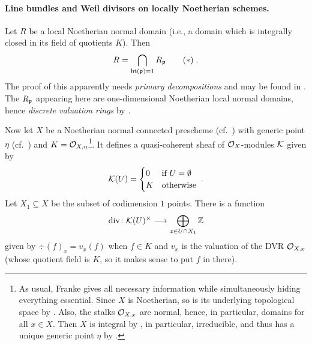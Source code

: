 \documentclass[a4paper,parskip=half,numbers=enddot, DIV=12]{scrreprt}
\begin{document}
\paragraph{Line bundles and Weil divisors on locally Noetherian schemes.} Let $R$ be a local Noetherian normal domain (i.e., a domain which is integrally closed in its field of quotients $K$). Then
\begin{align}\lbl{eq:IntersectionOfLocalizations}
	R=\bigcap_{\hoehe(\pp)=1}R_\pp\tag{$*$}\;.
\end{align}
The proof of this apparently needs \emph{primary decompositions} and may be found in \cite[Theorem~11.5]{matsumuraCRT}. The $R_{\mathfrak{p}}$ appearing here are one-dimensional Noetherian local normal domains, hence \emph{discrete valuation rings} by \cite[Theorem~21]{alg2}.

Now let $X$ be a Noetherian normal connected prescheme (cf.\ \cite[Definition~2.2.2, Definition~2.4.5]{alggeo1}) with generic point $\eta$ (cf.\ \cite[Definition~2.1.3]{alggeo1}) and $K=\mathcal{O}_{X,\eta}$\footnote{As usual, Franke gives all necessary information while simultaneously hiding everything essential. Since $X$ is Noetherian, so is its underlying topological space by \cite[Fact~2.2.3]{alggeo1}. Also, the stalks $\mathcal{O}_{X,x}$ are normal, hence, in particular, domains for all $x\in X$. Then $X$ is integral by \cite[Proposition~2.1.4]{alggeo1}, in particular, irreducible, and thus has a unique generic point $\eta$ by \cite[Fact~2.1.9]{alggeo1}.}. It defines a quasi-coherent sheaf of $\mathcal{O}_X$-modules $\mathcal{K}$ given by
\begin{align*}
	\mathcal{K}(U)=\begin{cases}
		0 & \text{if }U=\emptyset\\
		K & \text{otherwise}
	\end{cases}\;.
\end{align*}
Let $X_1\subseteq X$ be the subset of codimension $1$ points. There is a function
\begin{align*}
	\div\colon \Kk(U)^\times \morphism\bigoplus_{x\in U\cap X_1}\IZ
\end{align*}
given by $\div(f)_x=v_x(f)$ when $f\in K$ and $v_x$ is the valuation of the DVR $\mathcal{O}_{X,x}$ (whose quotient field is $K$, so it makes sense to put $f$ in there).
\end{document}

